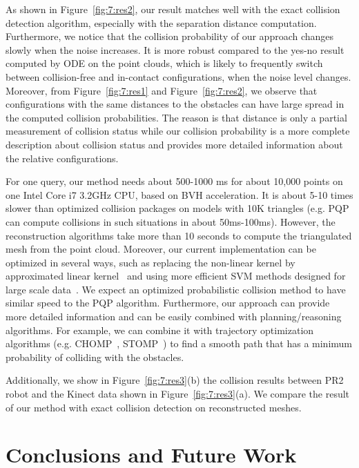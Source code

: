As shown in Figure~\ref{fig:7:res2}, our result matches well with the exact collision detection algorithm, especially with the separation distance computation. Furthermore, we notice that the collision probability of our approach changes slowly when the noise increases. It is more robust compared to the yes-no result computed by ODE on the point clouds, which is likely to frequently switch between collision-free and in-contact configurations, when the noise level changes.
Moreover, from Figure~\ref{fig:7:res1} and Figure~\ref{fig:7:res2}, we observe that configurations with the same distances to the obstacles can have large spread in the computed collision probabilities. The reason is that distance is only a partial measurement of collision status while our collision probability is a more complete description about collision status and provides more detailed information about the relative configurations.

For one query, our method needs about 500-1000 ms for about 10,000 points on one Intel Core i7 3.2GHz CPU, based on BVH acceleration. It is about 5-10 times slower than optimized collision packages on models with 10K triangles (e.g. PQP can compute collisions in such situations in about 50ms-100ms). However, the reconstruction algorithms take more than 10 seconds to compute the triangulated mesh from the point cloud. Moreover, our current implementation can be optimized in several ways, such as replacing the non-linear kernel by approximated linear kernel~\cite{Ali:nips:2007} and using more efficient SVM methods designed for large scale data~\cite{Fan:2008:LLL}. We expect an optimized probabilistic collision method to have similar speed to the PQP algorithm. Furthermore, our approach can provide more detailed information and can be easily combined with planning/reasoning algorithms. For example, we can combine it with trajectory optimization algorithms (e.g. CHOMP~\cite{Ratliff:2009}, STOMP~\cite{Mrinal:2011}) to find a smooth path that has a minimum probability of colliding with the obstacles.

Additionally, we show in Figure~\ref{fig:7:res3}(b) the collision results between PR2 robot and the Kinect data shown in Figure~\ref{fig:7:res3}(a). We compare the result of our method with exact collision detection on reconstructed meshes.





\section{Conclusions and Future Work}

